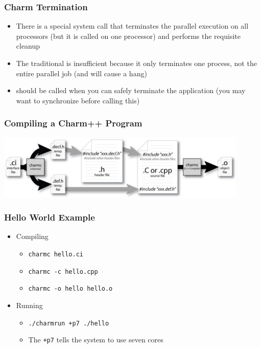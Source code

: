 \begin{frame}[fragile]
   \frametitle{Charm Termination}
   \begin{itemize}
   \item There is a special system call  that terminates the
     parallel execution on all processors (but it is called on one processor)
     and performs the requisite cleanup
   \item The traditional  is insufficient because it only
     terminates one process, not the entire parallel job (and will cause a
     hang)
   \item {} should be called when you can safely terminate the
     application (you may want to synchronize before calling this)
   \end{itemize}
\end{frame}

\begin{frame}
   \frametitle{Compiling a Charm++ Program}
   \begin{center}
     \includegraphics[width=0.9\textwidth]{figures/charmCompile.jpg}
   \end{center}
\end{frame}


\begin{frame}
  \frametitle{Hello World Example}
  \begin{itemize}
    \item Compiling
      \begin{itemize}
      \item \texttt{charmc hello.ci}
      \item \texttt{charmc -c hello.cpp}
      \item \texttt{charmc -o hello hello.o}
      \end{itemize}
    \item Running
      \begin{itemize}
      \item \texttt{./charmrun +p7 ./hello}
      \item The \texttt{+p7} tells the system to use seven cores
      \end{itemize}
    \end{itemize}
\end{frame}

